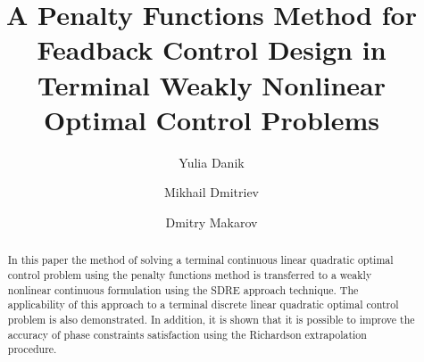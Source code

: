 \documentclass[12pt]{llncs}
\begin{document}
\fi

\title{A Penalty Functions Method for Feadback Control Design in Terminal Weakly Nonlinear Optimal Control Problems}

\author{Yulia Danik \and Mikhail Dmitriev \and Dmitry Makarov
}

\maketitle

\begin{abstract}

In this paper the method of solving a terminal continuous linear quadratic optimal control problem using the penalty functions method is transferred to a weakly nonlinear continuous formulation using the SDRE approach technique. The applicability of this approach to a terminal discrete linear quadratic optimal control problem is also demonstrated. In addition, it is shown that it is possible to improve the accuracy of phase constraints satisfaction using the Richardson extrapolation procedure.

\end{abstract}
\end{document}
